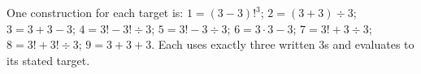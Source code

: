 One construction for each target is: $1=(3-3)!^3$; $2=(3+3)\div3$; $3=3+3-3$; $4=3!-3!\div3$; $5=3!-3\div3$; $6=3\cdot3-3$; $7=3!+3\div3$; $8=3!+3!\div3$; $9=3+3+3$. Each uses exactly three written $3$s and evaluates to its stated target.
